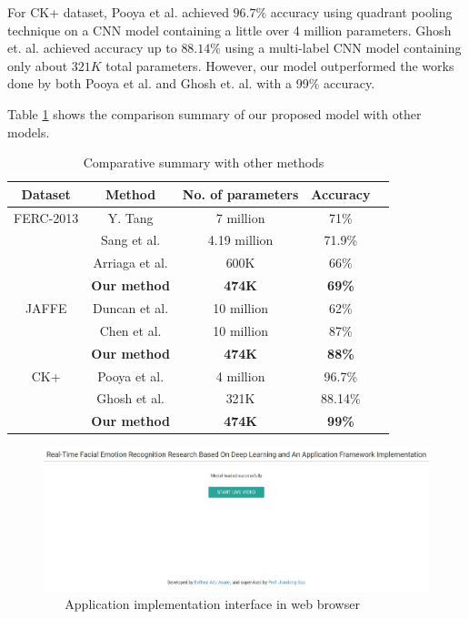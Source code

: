 \documentclass[master]{thesis-uestc}
\begin{document}
For CK+ dataset, Pooya et al.\cite{do_deep_7406361} achieved $96.7\%$ accuracy using quadrant pooling technique on a CNN model containing a little over 4 million parameters. Ghosh et. al. \cite{Ghosh_7344632} achieved accuracy up to $88.14\%$ using a multi-label CNN model containing only about $321K$ total parameters. However, our model outperformed the works done by both Pooya et al.\cite{do_deep_7406361} and Ghosh et. al. \cite{Ghosh_7344632} with a 99\% accuracy.

Table \ref{table_comparison} shows the comparison summary of our proposed model with other models. 

\begin{table}[ht]
\renewcommand{\arraystretch}{1.3}
\caption{\,\,\,\,\,Comparative summary with other methods}
\label{table_comparison}
\begin{center}
\begin{tabular}{|c|c|c|c|c|}
\hline
Dataset & Method & No. of parameters & Accuracy \\ \hline
FERC-2013 & Y. Tang\cite{tang2018} & 7 million & 71\% \\
                 & Sang et al.\cite{sang-2017} & 4.19 million & 71.9\% \\
	      & Arriaga et al.\cite{DBLP:journals/corr/abs-1710-07557} & 600K & 66\% \\
	      & \textbf{Our method} & \textbf{474K} & \textbf{69\%} \\
\hline
JAFFE & Duncan et al.\cite{duncan2016} & 10 million & 62\% \\
                 & Chen et al.\cite{7988558} & 10 million & 87\% \\
	      & \textbf{Our method} & \textbf{474K} & \textbf{88\%} \\
\hline
CK+ & Pooya et al.\cite{do_deep_7406361} & 4 million & 96.7\% \\
                 & Ghosh et al.\cite{Ghosh_7344632} & 321K & 88.14\% \\
	      & \textbf{Our method} & \textbf{474K} & \textbf{99\%} \\
\hline
\end{tabular}
\end{center}
\end{table}


\begin{figure}[ht]
\includegraphics[width=6in]{pic/rt-interface.JPG}
\caption{\,\,\,\,\,\,\,\,\,\,Application implementation interface in web browser}
\label{rt_interface}
\end{figure}
\end{document}
